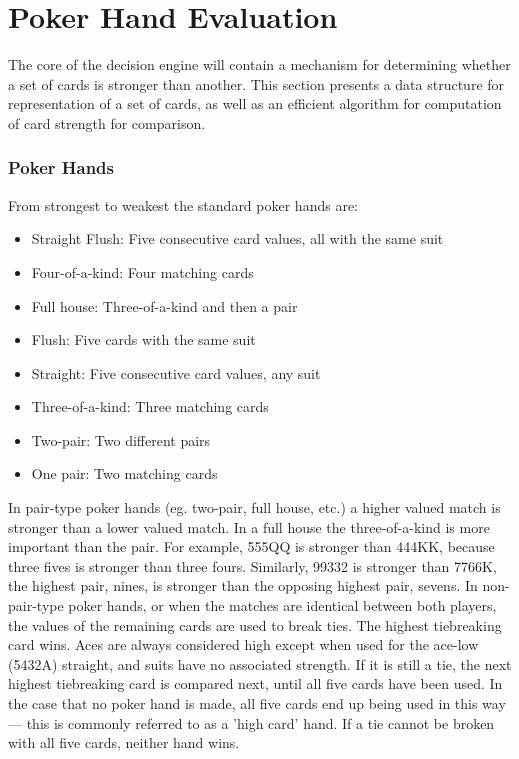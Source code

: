 
\newcommand{\xs}{$\spadesuit$}
\newcommand{\xh}{$\heartsuit$}
\newcommand{\xc}{$\clubsuit$}
\newcommand{\xd}{$\diamondsuit$}



\clearpage


\chapter{Poker Hand Evaluation}
\label{sec:HandEvaluation}

The core of the decision engine will contain a mechanism for determining whether a set of cards is stronger than another.
This section presents a data structure for representation of a set of cards, as well as an efficient algorithm for computation of card strength for comparison.


\subsection{Poker Hands}
\label{sec:PokerHands}


From strongest to weakest the standard poker hands are:

\begin{itemize}
\singlespacing
\item Straight Flush: Five consecutive card values, all with the same suit
\item Four-of-a-kind: Four matching cards
\item Full house: Three-of-a-kind and then a pair
\item Flush: Five cards with the same suit
\item Straight: Five consecutive card values, any suit
\item Three-of-a-kind: Three matching cards
\item Two-pair: Two different pairs
\item One pair: Two matching cards
\end{itemize}
In pair-type poker hands (eg. two-pair, full house, etc.) a higher valued match is stronger than a lower valued match.
In a full house the three-of-a-kind is more important than the pair.
For example, 555QQ is stronger than 444KK, because three fives is stronger than three fours.
Similarly, 99332 is stronger than 7766K, the highest pair, nines, is stronger than the opposing highest pair, sevens.
In non-pair-type poker hands, or when the matches are identical between both players, the values of the remaining cards are used to break ties.
The highest tiebreaking card wins.
Aces are always considered high except when used for the ace-low (5432A) straight, and suits have no associated strength.
If it is still a tie, the next highest tiebreaking card is compared next, until all five cards have been used.
In the case that no poker hand is made, all five cards end up being used in this way --- this is commonly referred to as a 'high card' hand.
If a tie cannot be broken with all five cards, neither hand wins.

